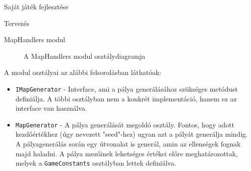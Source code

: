 \begin{MyChapter}{Saját játék fejlesztése}
\begin{MySection}{Tervezés}
\begin{MySubSection}{MapHandlers modul}
			\begin{figure}[h!]
				\centering
				\caption{A MapHandlers modul osztálydiagramja}
				\label{fig:uml:map}
			\end{figure}
			
			A modul osztályai az alábbi felsorolásban láthatóak:
			\begin{itemize}
				\item \texttt{IMapGenerator} - Interface, ami a pálya generálásához szükséges metódust definiálja. A többi osztályban nem a konkrét implementáció, hanem ez az interface van használva.
				
				\item \texttt{MapGenerator} - A pálya generálását megoldó osztály. Fontos, hogy adott kezdőértékhez (úgy nevezett "seed"-hez) ugyan azt a pályát generálja mindig. A pályagenerálás során egy útvonalat is generál, amin az ellenségek fognak majd haladni. A pálya mezőinek lehetséges értékei előre meghatározottak, melyek a \texttt{GameConstants} osztályban lettek definiálva.
				

\end{itemize}
\end{MySubSection}
\end{MySection}
\end{MyChapter}
